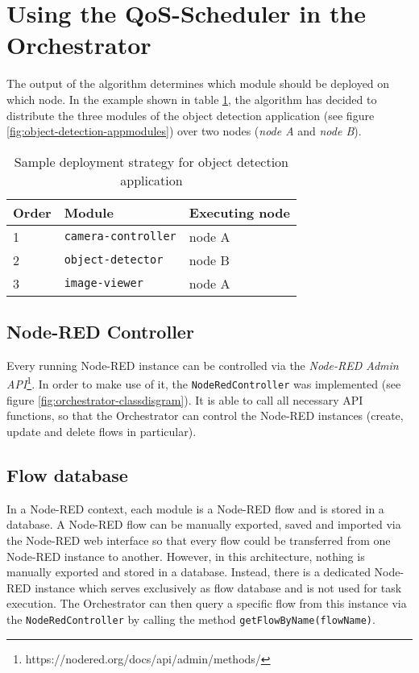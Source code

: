 \section{Using the QoS-Scheduler in the Orchestrator}

The output of the algorithm determines which module should be deployed on which node. In the example shown in table \ref{tab:deployment-strategy-example}, the algorithm has decided to distribute the three modules of the object detection application (see figure \ref{fig:object-detection-appmodules}) over two nodes (\textit{node A} and \textit{node B}).

\begin{table}[htb]
    \centering
    \begin{tabular}{|m{1.5cm}|m{4cm}|m{3.5cm}|}
        \hline
        \textbf{Order} & \textbf{Module} & \textbf{Executing node}\\
        \hline
        1 & \texttt{camera-controller} & node A\\
        \hline
        2 & \texttt{object-detector} & node B\\
        \hline
        3 & \texttt{image-viewer} & node A\\
        \hline
    \end{tabular}
    \caption{Sample deployment strategy for object detection application}
    \label{tab:deployment-strategy-example}
\end{table}

\subsection*{Node-RED Controller}

Every running Node-RED instance can be controlled via the \textit{Node-RED Admin API}\footnote{https://nodered.org/docs/api/admin/methods/}. In order to make use of it, the \texttt{NodeRedController} was implemented (see figure \ref{fig:orchestrator-classdisgram}). It is able to call all necessary API functions, so that the Orchestrator can control the Node-RED instances (create, update and delete flows in particular).

\subsection*{Flow database}
In a Node-RED context, each module is a Node-RED flow and is stored in a database.
A Node-RED flow can be manually exported, saved and imported via the Node-RED web interface so that every flow could be transferred from one Node-RED instance to another.
However, in this architecture, nothing is manually exported and stored in a database.
Instead, there is a dedicated Node-RED instance which serves exclusively as flow database and is not used for task execution.
The Orchestrator can then query a specific flow from this instance via the \texttt{NodeRedController} by calling the method \texttt{getFlowByName(flowName)}.

